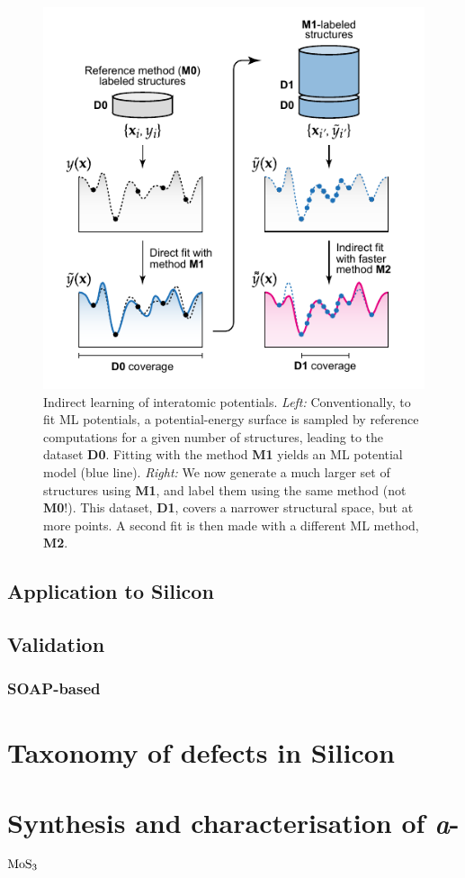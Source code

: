 \documentclass[12pt,a4paper,twoside,nobind]{ociamthesis}
\begin{document}
\begin{figure}[t]
  \includegraphics[width=0.5\linewidth]{schematic.pdf}
  \caption{
  Indirect learning of interatomic potentials. 
  \textit{Left:} 
  Conventionally, to fit ML potentials, a potential-energy surface is sampled by reference computations
  for a given number of structures, leading to the dataset \textbf{D0}.
  Fitting with the method \textbf{M1} yields an ML potential model (blue line).
  \textit{Right:}
  We now generate a much larger set of structures using \textbf{M1}, and label them using the same method (not \textbf{M0}!).
  This dataset, \textbf{D1}, covers a narrower structural space, but at more points.
  A second fit is then made with a different ML method, \textbf{M2}.
  }
  \label{fig:schematic}
\end{figure}

\subsection{Application to Silicon}



\subsection{Validation}
\subsubsection{SOAP-based}

\section{Taxonomy of defects in Silicon}

\section{Synthesis and characterisation of \emph{a}-$\ce{MoS3}$}
\end{document}
